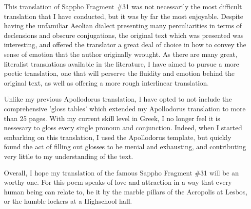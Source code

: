 This translation of Sappho Fragment \#31 was not necessarily the most difficult translation that I have conducted, but it was by far the most enjoyable. Despite having the unfamiliar Aeolian dialect presenting many perculiarities in terms of declensions and obscure conjugations, the original text which was presented was interesting, and offered the translator a great deal of choice in how to convey the sense of emotion that the author originally wrought. As there are many great, literalist translations available in the literature, I have aimed to pursue a more poetic translation, one that will perserve the fluidity and emotion behind the original text, as well as offering a more rough interlinear translation.

Unlike my previous Apollodorus translation, I have opted to not include the comprehensive 'gloss tables' which extended my Apollodorus translation to more than 25 pages. With my current skill level in Greek, I no longer feel it is nessesary to gloss every single pronoun and conjunction. Indeed, when I started embarking on this translation, I used the Apollodorus template, but quickly found the act of filling out glosses to be menial and exhausting, and contributing very little to my understanding of the text.

Overall, I hope my translation of the famous Sappho Fragment \#31 will be an worthy one. For this poem speaks of love and attraction in a way that every human being can relate to, be it by the marble pillars of the Acropolis at Lesbos, or the humble lockers at a Highschool hall.
\clearpage

